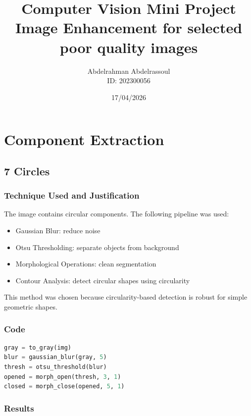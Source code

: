 \documentclass[12pt]{article}
\title{\textbf{Computer Vision Mini Project \\ Image Enhancement for selected poor quality images}}
\author{Abdelrahman Abdelrassoul \\ ID: 202300056}
\date{17/04/2026}
\begin{document}
\maketitle
\pagebreak
\tableofcontents
\newpage

\section{Component Extraction}

\subsection{7 Circles}

\subsubsection{Technique Used and Justification}

The image contains circular components. The following pipeline was used:

\begin{itemize}
    \item Gaussian Blur: reduce noise
    \item Otsu Thresholding: separate objects from background
    \item Morphological Operations: clean segmentation
    \item Contour Analysis: detect circular shapes using circularity
\end{itemize}

This method was chosen because circularity-based detection is robust for simple geometric shapes.

\subsubsection{Code}

\begin{lstlisting}[language=Python]
gray = to_gray(img)
blur = gaussian_blur(gray, 5)
thresh = otsu_threshold(blur)
opened = morph_open(thresh, 3, 1)
closed = morph_close(opened, 5, 1)
\end{lstlisting}

\subsubsection{Results}
\end{document}
